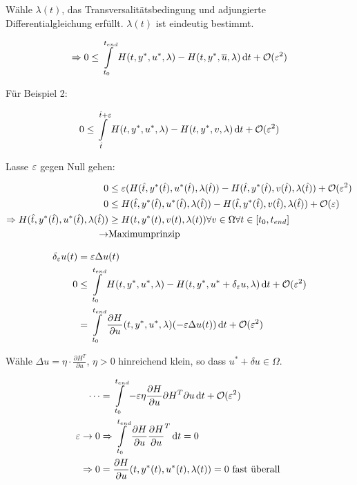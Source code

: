 Wähle $\lambda(t)$, das Transversalitätsbedingung und adjungierte Differentialgleichung erfüllt. $\lambda(t)$ ist eindeutig bestimmt.

\begin{align*}
\Rightarrow 0 &\leq \int\limits_{t_0}^{t_{end}} H(t, y^*, u^*, \lambda) - H(t, y^*, \overline u, \lambda) \,\mathrm d t + \mathcal O(\varepsilon^2) \\
\end{align*}

Für Beispiel 2:

\begin{align*}
0 & \leq \int\limits_{\hat t}^{\hat t + \varepsilon} H(t, y^*, u^*, \lambda) - H(t, y^*, v, \lambda) \,\mathrm d t + \mathcal O(\varepsilon^2) \\
\end{align*}

Lasse $\varepsilon$ gegen Null gehen:


\begin{align*}
0 & \leq \varepsilon(H(\hat t, y^*(\hat t), u^*(\hat t), \lambda(\hat t)) - H({\hat t}, y^*({\hat t}), v({\hat t}), \lambda({\hat t})) + \mathcal O(\varepsilon^2) \\
0 & \leq H({\hat t}, y^*({\hat t}), u^*({\hat t}), \lambda({\hat t})) - H({\hat t}, y^*({\hat t}), v({\hat t}), \lambda({\hat t})) + \mathcal O(\varepsilon) \\
\Rightarrow H({\hat t}, y^*({\hat t}), u^*({\hat t}), \lambda({\hat t})) & \geq H(t, y^*(t), v(t), \lambda(t)) \forall v \in \Omega \forall t \in [t_0, {t_{end}}] \\
\to & \text{Maximumprinzip}
\end{align*}


\begin{align*}
\delta_\varepsilon u(t) &= \varepsilon \Delta u(t) \\
0 & \leq \int\limits_{t_0}^{t_{end}} H(t, y^*, u^*, \lambda) - H(t, y^*, u^* + \delta_\varepsilon u, \lambda) \,\mathrm d t + \mathcal O(\varepsilon^2) \\
&= \int\limits_{t_0}^{t_{end}} \frac{\partial H}{\partial u} (t, y^*, u^*, \lambda) ( - \varepsilon \Delta u(t)) \,\mathrm d t + \mathcal O(\varepsilon^2)
\end{align*}

Wähle $\Delta u = \eta \cdot \frac{\partial H^T}{\partial u}$, $\eta > 0$ hinreichend klein, so dass $u^* + \delta u \in \Omega$.

\begin{align*}
\cdots &= \int\limits_{t_0}^{t_{end}} - \varepsilon \eta \frac{\partial H}{\partial u}{\partial H^T}{\partial u} \,\mathrm d t + \mathcal O(\varepsilon^2) \\
\varepsilon \to 0 & \Rightarrow \int\limits_{t_0}^{t_{end}} \frac{\partial H}{\partial u} \frac{\partial H}{\partial u}^T \,\mathrm d t = 0 \\
\Rightarrow 0 &= \frac{\partial H}{\partial u} (t, y^*(t), u^*(t), \lambda(t)) = 0 \text{ fast überall } \\
\end{align*}

